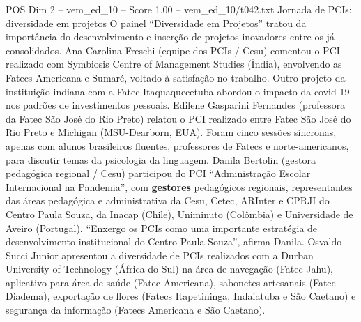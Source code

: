 \begin{textsample}{POS Dim 2 – vem\_ed\_10 – Score 1.00 – vem\_ed\_10/t042.txt}  \label{ex:f2_pos_187}
Jornada de PCIs: diversidade em projetos O painel “Diversidade em Projetos” tratou da importância do desenvolvimento e inserção de projetos inovadores entre os já consolidados.
Ana Carolina Freschi (equipe dos PCIs / Cesu) comentou o PCI realizado com Symbiosis Centre of Management Studies (Índia), envolvendo as Fatecs Americana e Sumaré, voltado à satisfação no trabalho.
Outro projeto da instituição indiana com a Fatec Itaquaquecetuba abordou o impacto da covid-19 nos padrões de investimentos pessoais.
Edilene Gasparini Fernandes (professora da Fatec São José do Rio Preto) relatou o PCI realizado entre Fatec São José do Rio Preto e Michigan (MSU-Dearborn, EUA).
Foram cinco sessões síncronas, apenas com alunos brasileiros fluentes, professores de Fatecs e norte-americanos, para discutir temas da psicologia da linguagem.
Danila Bertolin (gestora pedagógica regional / Cesu) participou do PCI “Administração Escolar Internacional na Pandemia”, com \textbf{gestores} pedagógicos regionais, representantes das áreas pedagógica e administrativa da Cesu, Cetec, ARInter e CPRJI do Centro Paula Souza, da Inacap (Chile), Uniminuto (Colômbia) e Universidade de Aveiro (Portugal). “Enxergo os PCIs como uma importante estratégia de desenvolvimento institucional do Centro Paula Souza”, afirma Danila.
Osvaldo Succi Junior apresentou a diversidade de PCIs realizados com a Durban University of Technology (África do Sul) na área de navegação (Fatec Jahu), aplicativo para área de saúde (Fatec Americana), sabonetes artesanais (Fatec Diadema), exportação de flores (Fatecs Itapetininga, Indaiatuba e São Caetano) e segurança da informação (Fatecs Americana e São Caetano).

\end{textsample}
